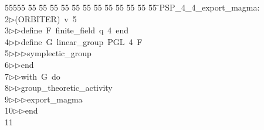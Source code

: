 %
%
\begin{tabbing}
55555 \= 55 \= 55 \= 55 \= 55 \= 55 \= 55 \= 55 \= 55 \= 55 \= 55 \= 55 \= 55 \= \>PSP\_4\_4\_export\_magma:\\[0pt]
2\>$\triangleright$\>(ORBITER)\ v\ 5\ \\[0pt]
3\>$\triangleright$\>$\triangleright$\>define\ F\ finite\_field\ q\ 4\ end\ \\[0pt]
4\>$\triangleright$\>$\triangleright$\>define\ G\ linear\_group\ PGL\ 4\ F\ \\[0pt]
5\>$\triangleright$\>$\triangleright$\>$\triangleright$\>symplectic\_group\ \\[0pt]
6\>$\triangleright$\>$\triangleright$\>end\ \\[0pt]
7\>$\triangleright$\>$\triangleright$\>with\ G\ do\ \\[0pt]
8\>$\triangleright$\>$\triangleright$\>group\_theoretic\_activity\ \\[0pt]
9\>$\triangleright$\>$\triangleright$\>$\triangleright$\>export\_magma\ \\[0pt]
10\>$\triangleright$\>$\triangleright$\>end\\[0pt]
11\>\end{tabbing}
